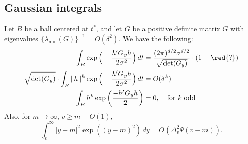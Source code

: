 \documentclass{article}
\begin{document}
	\subsection{Gaussian integrals}
	\label{subsec:gaussian-integrals}
	Let $B$ be a ball centered at $t^*$, and let $G$ be a positive definite matrix $G$ with eigenvalues $\{\lambda_{\min}(G)\}^{-1} = O(\delta^2)$. We have the following:
	\begin{equation}
		\label{pf:approximate-joint-distribution-1}
		\begin{aligned}
			\int_{B} \exp\Big(-\frac{h'G_y h}{2\sigma^2}\Big) \,dt & = \frac{(2\pi)^{d/2}\sigma^{d/2}}{\sqrt{\det(G_y)}} \cdot (1 + \red{?}) \\
			\sqrt{\det(G_y)} \cdot \int_{B} \|h\|^k \exp\Big(-\frac{h'G_y h}{2\sigma^2}\Big) \,dt & = O(\delta^{k}) \\
			\int_{B} h^k \exp\bigg(\frac{-h'G_yh}{2}\bigg) & = 0, \quad \textrm{for $k$ odd}
		\end{aligned}
	\end{equation}
	Also, for $m \to \infty$, $v \geq m - O(1)$, 
	\begin{equation}
		\label{pf:approximate-joint-distribution-1.5}
		\int_{v}^{\infty} |y - m|^2\exp((y - m)^2) \,dy = O(\Delta_v^2 \Psi(v - m)).
	\end{equation}
	
\end{document}
